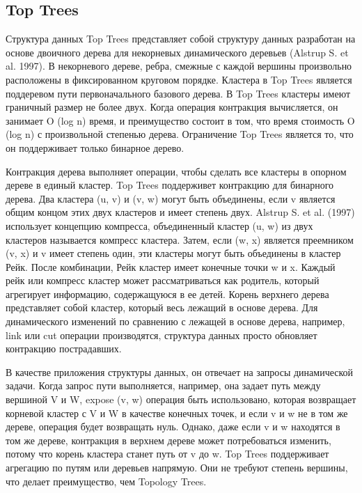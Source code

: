 \documentclass[specification,annotation,times]{itmo-student-thesis}
\newcommand{\revise}[1]{{\color{red!70!black} #1 }}
\begin{document}
\subsection{Top Trees}

\revise{
Структура данных Top Trees представляет собой структуру данных разработан на основе двоичного дерева для некорневых динамического деревьев (Alstrup S. et al. 1997). В некорневого дереве, ребра, смежные с 
каждой вершины произвольно расположены в фиксированном круговом порядке. Кластера в Top Trees является поддеревом пути первоначального базового дерева. В Top Trees кластеры имеют граничный размер не более 
двух. Когда операция контракция вычисляется, он занимает O (log n) время, и преимущество состоит в том, что время стоимость O (log n) с произвольной степенью дерева. Ограничение Top Trees является то, что 
он поддерживает только бинарное дерево.
}

\revise{
Контракция дерева выполняет операции, чтобы сделать все кластеры в опорном дереве в единый кластер. Top Trees поддерживет контракцию для бинарного дерева. Два кластера (u, v) и (v, w) могут быть 
объединены, если v является общим концом этих двух кластеров и имеет степень двух. Alstrup S. et al. (1997) использует концепцию компресса, объединенный кластер (u, w) из двух кластеров называется 
компресс кластера. Затем, если (w, x) является преемником (v, x) и v имеет степень один, эти кластеры могут быть объединены в кластер Рейк. После комбинации, Рейк кластер имеет конечные точки w и x. 
Каждый рейк или компресс кластер может рассматриваться как родитель, который агрегирует информацию, содержащуюся в ее детей. Корень верхнего дерева представляет собой кластер, который весь лежащий в 
основе дерева. Для динамического изменений по сравнению с лежащей в основе дерева, например, link или cut операции производятся, структура данных просто обновляет контракцию пострадавших. 
}

\revise{
В качестве приложения структуры данных, он отвечает на запросы динамической задачи. Когда запрос пути выполняется, например, она задает путь между вершиной V и W, expose (v, w) операция быть использовано, 
которая возвращает корневой кластер с V и W в качестве конечных точек, и если v и w не в том же дереве, операция будет возвращать нуль. Однако, даже если v и w находятся в том же дереве, контракция в 
верхнем дереве может потребоваться изменить, потому что корень кластера станет путь от v до w. Top Trees поддерживает агрегацию по путям или деревьев напрямую. Они не требуют степень вершины, что делает 
преимущество, чем Topology Trees. 
}
\end{document}
